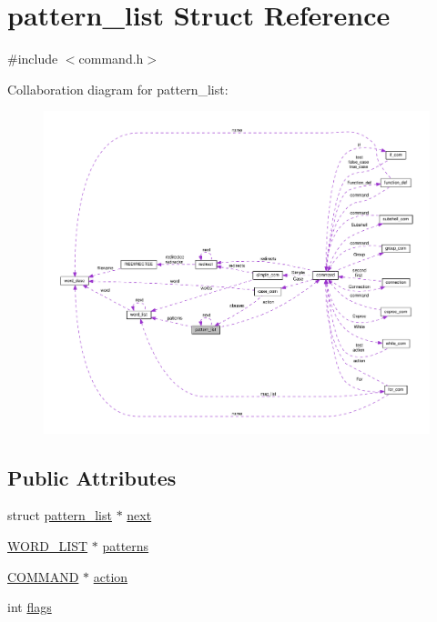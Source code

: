 \hypertarget{structpattern__list}{}\section{pattern\+\_\+list Struct Reference}
\label{structpattern__list}


{\ttfamily \#include $<$command.\+h$>$}



Collaboration diagram for pattern\+\_\+list\+:
\nopagebreak
\begin{figure}[H]
\begin{center}
\leavevmode
\includegraphics[width=350pt]{structpattern__list__coll__graph}
\end{center}
\end{figure}
\subsection*{Public Attributes}
\begin{DoxyCompactItemize}
\item 
struct \hyperlink{structpattern__list}{pattern\+\_\+list} $\ast$ \hyperlink{structpattern__list_a298ee7f13c0ded6032300588bc4739c6}{next}
\item 
\hyperlink{command_8h_ac42a7b781459884316a1f2ffe79e8a62}{W\+O\+R\+D\+\_\+\+L\+I\+ST} $\ast$ \hyperlink{structpattern__list_a434e80f6704633cfb08dab20c1d28076}{patterns}
\item 
\hyperlink{command_8h_a8c41dec142c299806885773c902c0d87}{C\+O\+M\+M\+A\+ND} $\ast$ \hyperlink{structpattern__list_ae31932a25ce2a1a616aecae649f78045}{action}
\item 
int \hyperlink{structpattern__list_abae207e9054326f960ead31780ccf5ea}{flags}
\end{DoxyCompactItemize}


